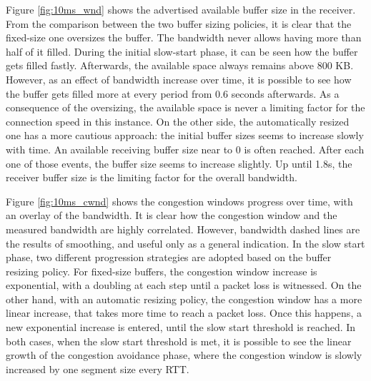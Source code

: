 \documentclass[a4paper,10pt]{article}
\begin{document}
Figure \ref{fig:10ms_wnd} shows the advertised available buffer size in the receiver. From the comparison between the two buffer sizing policies, it is clear that the fixed-size one oversizes the buffer. The bandwidth never allows having more than half of it filled. During the initial slow-start phase, it can be seen how the buffer gets filled fastly. Afterwards, the available space always remains above 800 KB. However, as an effect of bandwidth increase over time, it is possible to see how the buffer gets filled more at every period from 0.6 seconds afterwards. As a consequence of the oversizing, the available space is never a limiting factor for the connection speed in this instance. 
On the other side, the automatically resized one has a more cautious approach: the initial buffer sizes seems to increase slowly with time. An available receiving buffer size near to 0 is often reached. After each one of those events, the buffer size seems to increase slightly. Up until 1.8s, the receiver buffer size is the limiting factor for the overall bandwidth. 

Figure \ref{fig:10ms_cwnd} shows the congestion windows progress over time, with an overlay of the bandwidth. It is clear how the congestion window and the measured bandwidth are highly correlated. However, bandwidth dashed lines are the results of smoothing, and useful only as a general indication. In the slow start phase, two different progression strategies are adopted based on the buffer resizing policy. For fixed-size buffers, the congestion window increase is exponential, with a doubling at each step until a packet loss is witnessed. On the other hand, with an automatic resizing policy, the congestion window has a more linear increase, that takes more time to reach a packet loss. Once this happens, a new exponential increase is entered, until the slow start threshold is reached.
In both cases, when the slow start threshold is met, it is possible to see the linear growth of the congestion avoidance phase, where the congestion window is slowly increased by one segment size every RTT.
\end{document}
